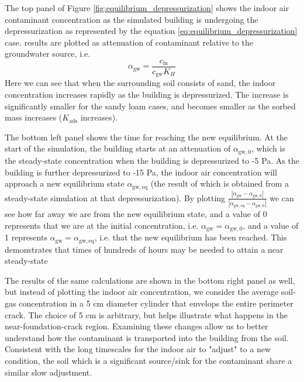 The top panel of Figure \ref{fig:equilibrium_depressurization} shows the indoor air contaminant concentration as the simulated building is undergoing the depressurization as represented by the equation \eqref{eq:equilibrium_depressurization} case.
results are plotted as attenuation of contaminant relative to the groundwater source, i.e.
\begin{equation}
  \alpha_\mathrm{gw} = \frac{c_\mathrm{in}}{c_\mathrm{gw} K_H}
\end{equation}
Here we can see that when the surrounding soil consists of sand, the indoor concentration increases rapidly as the building is depressurized.
The increase is significantly smaller for the sandy loam cases, and becomes smaller as the sorbed mass increases ($K_\mathrm{ads}$ increases).\par

The bottom left panel shows the time for reaching the new equilibrium.
At the start of the simulation, the building starts at an attenuation of $\alpha_\mathrm{gw,0}$, which is the steady-state concentration when the building is depressurized to -5 Pa.
As the building is further depressurized to -15 Pa, the indoor air concentration will approach a new equilibrium state $\alpha_\mathrm{gw,eq}$ (the result of which is obtained from a steady-state simulation at that depressurization).
By plotting $\frac{|\alpha_\mathrm{gw}-\alpha_\mathrm{gw,0}|}{|\alpha_\mathrm{gw,eq}-\alpha_\mathrm{gw,0}|}$ we can see how far away we are from the new equilibrium state, and a value of 0 represents that we are at the initial concentration, i.e. $\alpha_\mathrm{gw} = \alpha_\mathrm{gw,0}$, and a value of 1 represents $\alpha_\mathrm{gw} = \alpha_\mathrm{gw,eq}$, i.e. that the new equilibrium has been reached.
This demonstrates that times of hundreds of hours may be needed to attain a near steady-state\par

The results of the same calculations are shown in the bottom right panel as well, but instead of plotting the indoor air concentration, we consider the average soil-gas concentration in a 5 cm diameter cylinder that envelops the entire perimeter crack.
The choice of 5 cm is arbitrary, but helps illustrate what happens in the near-foundation-crack region.
Examining these changes allow us to better understand how the contaminant is transported into the building from the soil.
Consistent with the long timescales for the indoor air to "adjust" to a new condition, the soil which is a significant source/sink for the contaminant share a similar slow adjustment.\par

